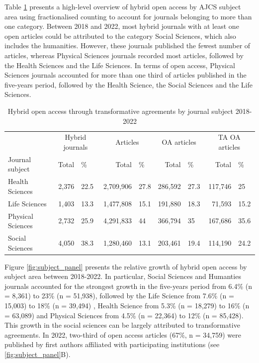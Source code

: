 \documentclass[a4paper,man,floatsintext,longtable,noextraspace,12pt]{apa6}
\begin{document}
Table \ref{tab:subject_summary_table} presents a high-level overview of
hybrid open access by AJCS subject area using fractionalised counting to
account for journals belonging to more than one category. Between 2018
and 2022, most hybrid journals with at least one open articles could be
attributed to the category Social Sciences, which also includes the
humanities. However, these journals published the fewest number of
articles, whereas Physical Sciences journals recorded most articles,
followed by the Health Sciences and the Life Sciences. In terms of open
access, Physical Sciences journals accounted for more than one third of
articles published in the five-years period, followed by the Health
Science, the Social Sciences and the Life Sciences.

\begin{table}[H]

\caption{\label{tab:subject_summary_table}Hybrid open access through transformative agreements by journal subject 2018-2022}
\centering
\begin{tabular}[t]{lrlrlrlrl}
\toprule
\multicolumn{1}{c}{ } & \multicolumn{2}{c}{Hybrid journals} & \multicolumn{2}{c}{Articles} & \multicolumn{2}{c}{OA articles} & \multicolumn{2}{c}{TA OA articles} \\
\cmidrule(l{3pt}r{3pt}){2-3} \cmidrule(l{3pt}r{3pt}){4-5} \cmidrule(l{3pt}r{3pt}){6-7} \cmidrule(l{3pt}r{3pt}){8-9}
Journal subject & Total & \% & Total & \% & Total & \% & Total & \%\\
\midrule
Health Sciences & 2,376 & 22.5 & 2,709,906 & 27.8 & 286,592 & 27.3 & 117,746 & 25\\
Life Sciences & 1,403 & 13.3 & 1,477,808 & 15.1 & 191,880 & 18.3 & 71,593 & 15.2\\
Physical Sciences & 2,732 & 25.9 & 4,291,833 & 44 & 366,794 & 35 & 167,686 & 35.6\\
Social Sciences & 4,050 & 38.3 & 1,280,460 & 13.1 & 203,461 & 19.4 & 114,190 & 24.2\\
\bottomrule
\end{tabular}
\end{table}

Figure \ref{fig:subject_panel} presents the relative growth of hybrid
open access by subject area between 2018-2022. In particular, Social
Sciences and Humanties journals accounted for the strongest growth in
the five-years period from 6.4\% (n = 8,361) to 23\% (n = 51,938),
followed by the Life Science from 7.6\% (n = 15,003) to 18\% (n =
39,494) , Health Science from 5.3\% (n = 18,279) to 16\% (n = 63,089)
and Physical Sciences from 4.5\% (n = 22,364) to 12\% (n = 85,428). This
growth in the social sciences can be largely attributed to
transformative agreements. In 2022, two-third of open access articles
(67\%, n = 34,759) were published by first authors affiliated with
participating institutions (see \ref{fig:subject_panel}B).
\end{document}

